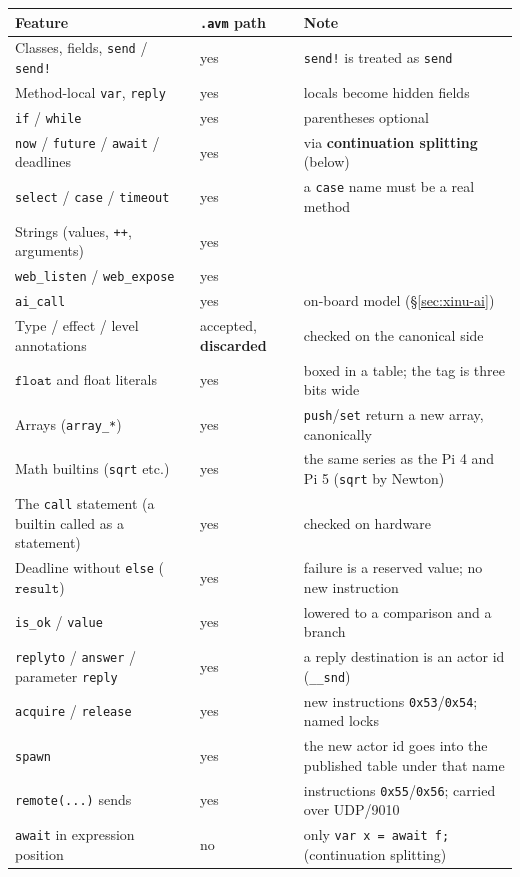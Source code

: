 \documentclass[11pt,a4paper]{article}
\newcommand{\ty}[1]{\ensuremath{\mathtt{#1}}}
\begin{document}
\begin{center}
\small
\begin{tabular}{@{}lll@{}}
\toprule
Feature & \texttt{.avm} path & Note \\
\midrule
Classes, fields, \texttt{send} / \texttt{send!} & yes & \texttt{send!} is treated as \texttt{send} \\
Method-local \texttt{var}, \texttt{reply} & yes & locals become hidden fields \\
\texttt{if} / \texttt{while} & yes & parentheses optional \\
\texttt{now} / \texttt{future} / \texttt{await} / deadlines & yes & via \textbf{continuation splitting} (below) \\
\texttt{select} / \texttt{case} / \texttt{timeout} & yes & a \texttt{case} name must be a real method \\
Strings (values, \texttt{++}, arguments) & yes & \\
\texttt{web\_listen} / \texttt{web\_expose} & yes & \\
\texttt{ai\_call} & yes & on-board model (\S\ref{sec:xinu-ai}) \\
\midrule
Type / effect / level annotations & accepted, \textbf{discarded} & checked on the canonical side \\
\ty{float} and float literals & yes & boxed in a table; the tag is three bits wide \\
Arrays (\texttt{array\_*}) & yes & \texttt{push}/\texttt{set} return a new array, canonically \\
Math builtins (\texttt{sqrt} etc.) & yes & the same series as the Pi 4 and Pi 5 (\texttt{sqrt} by Newton) \\
The \texttt{call} statement (a builtin called as a statement) & yes & checked on hardware \\
Deadline without \texttt{else} (\ty{result}) & yes & failure is a reserved value; no new instruction \\
\texttt{is\_ok} / \texttt{value} & yes & lowered to a comparison and a branch \\
\texttt{replyto} / \texttt{answer} / parameter \texttt{reply} & yes & a reply destination is an actor id (\texttt{\_\_snd}) \\
\texttt{acquire} / \texttt{release} & yes & new instructions \texttt{0x53}/\texttt{0x54}; named locks \\
\texttt{spawn} & yes & the new actor id goes into the published table under that name \\
\texttt{remote(...)} sends & yes & instructions \texttt{0x55}/\texttt{0x56}; carried over UDP/9010 \\
\texttt{await} in expression position & no & only \texttt{var x = await f;} (continuation splitting) \\
\bottomrule
\end{tabular}
\end{center}
\end{document}
